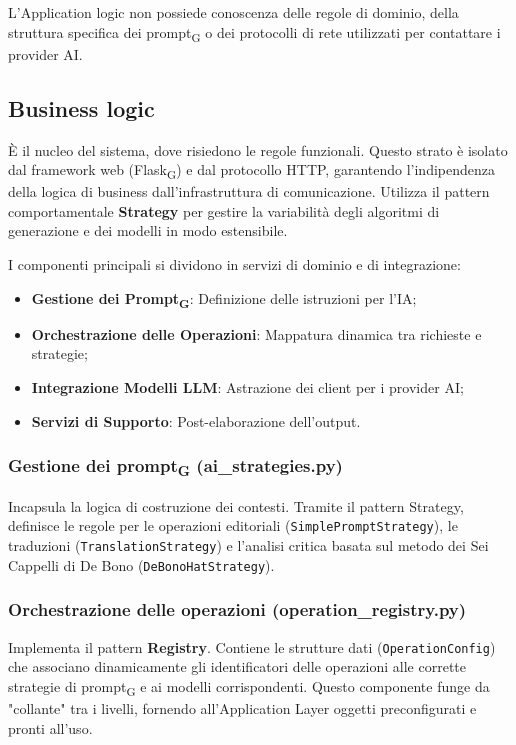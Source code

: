 \documentclass[11pt,a4paper]{article}
\newcommand{\gls}[1]{#1\textsubscript{G}}
\begin{document}
L'Application logic non possiede conoscenza delle regole di dominio, della struttura specifica dei \gls{prompt} o dei protocolli di rete utilizzati per contattare i provider AI.

\subsection{Business logic}
È il nucleo del sistema, dove risiedono le regole funzionali. Questo strato è isolato dal framework web (\gls{Flask}) e dal protocollo HTTP, garantendo l'indipendenza della logica di business dall'infrastruttura di comunicazione. Utilizza il pattern comportamentale \textbf{Strategy} per gestire la variabilità degli algoritmi di generazione e dei modelli in modo estensibile.

I componenti principali si dividono in servizi di dominio e di integrazione:
\begin{itemize}
    \item \textbf{Gestione dei \gls{Prompt}}: Definizione delle istruzioni per l'IA;
    \item \textbf{Orchestrazione delle Operazioni}: Mappatura dinamica tra richieste e strategie;
    \item \textbf{Integrazione Modelli LLM}: Astrazione dei client per i provider AI;
    \item \textbf{Servizi di Supporto}: Post-elaborazione dell'output.
\end{itemize}

\subsubsection{Gestione dei \gls{prompt} (ai\_strategies.py)}
Incapsula la logica di costruzione dei contesti. Tramite il pattern Strategy, definisce le regole per le operazioni editoriali (\texttt{SimplePromptStrategy}), le traduzioni (\texttt{TranslationStrategy}) e l’analisi critica basata sul metodo dei Sei Cappelli di De Bono (\texttt{DeBonoHatStrategy}).

\subsubsection{Orchestrazione delle operazioni (operation\_registry.py)}
Implementa il pattern \textbf{Registry}. Contiene le strutture dati (\texttt{OperationConfig}) che associano dinamicamente gli identificatori delle operazioni alle corrette strategie di \gls{prompt} e ai modelli corrispondenti. Questo componente funge da "collante" tra i livelli, fornendo all'Application Layer oggetti preconfigurati e pronti all'uso.
\end{document}

